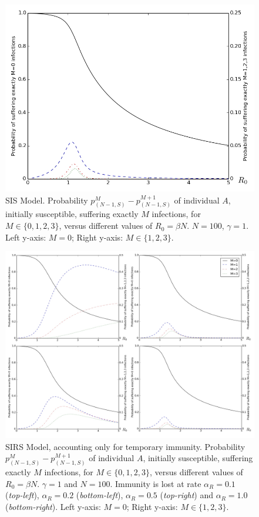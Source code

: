 \documentclass[preprint,12pt]{elsarticle}
\begin{document}
\begin{figure}[h!]
  \centering
 \includegraphics[width=\textwidth]{SIS_Homogeneous.jpg}
 \caption{SIS Model. Probability $p_{(N-1,S)}^M-p_{(N-1,S)}^{M+1}$ of individual $A$, initially susceptible, suffering exactly $M$ infections, for $M\in\{0,1,2,3\}$, versus different values of $R_0=\beta N$. $N=100$, $\gamma=1$. Left y-axis: $M=0$; Right y-axis: $M\in\{1,2,3\}$.}
  \label{fig:sis_homogeneous}
\end{figure}

\begin{figure}[h!]
  \centering
 \includegraphics[width=\textwidth]{SIRS.jpg}
 \caption{SIRS Model, accounting only for temporary immunity. Probability $p_{(N-1,S)}^M-p_{(N-1,S)}^{M+1}$ of individual $A$, initially susceptible, suffering exactly $M$ infections, for $M\in\{0,1,2,3\}$, versus different values of $R_0=\beta N$. $\gamma=1$ and $N=100$. Immunity is lost at rate
$\alpha_R=0.1$ ({\it top-left}), $\alpha_R=0.2$ ({\it bottom-left}), $\alpha_R=0.5$ ({\it top-right}) and $\alpha_R=1.0$ ({\it bottom-right}).
Left y-axis: $M=0$; Right y-axis: $M\in\{1,2,3\}$.}
  \label{fig:sirs}
\end{figure}
\end{document}
